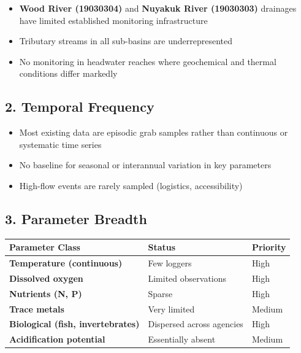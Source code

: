 \documentclass[
  letterpaper,
]{scrbook}
\providecommand{\tightlist}{%
  \setlength{\itemsep}{0pt}\setlength{\parskip}{0pt}}\usepackage{longtable,booktabs,array}
\begin{document}
\begin{itemize}
\tightlist
\item
  \textbf{Wood River (19030304)} and \textbf{Nuyakuk River (19030303)}
  drainages have limited established monitoring infrastructure
\item
  Tributary streams in all sub-basins are underrepresented
\item
  No monitoring in headwater reaches where geochemical and thermal
  conditions differ markedly
\end{itemize}

\subsection{2. Temporal Frequency}\label{temporal-frequency}

\begin{itemize}
\tightlist
\item
  Most existing data are episodic grab samples rather than continuous or
  systematic time series
\item
  No baseline for seasonal or interannual variation in key parameters
\item
  High-flow events are rarely sampled (logistics, accessibility)
\end{itemize}

\subsection{3. Parameter Breadth}\label{parameter-breadth}

\begin{longtable}[]{@{}
  >{\raggedright\arraybackslash}p{}
  >{\raggedright\arraybackslash}p{}
  >{\raggedright\arraybackslash}p{}@{}}
\toprule\noalign{}
\begin{minipage}[b]{\linewidth}\raggedright
Parameter Class
\end{minipage} & \begin{minipage}[b]{\linewidth}\raggedright
Status
\end{minipage} & \begin{minipage}[b]{\linewidth}\raggedright
Priority
\end{minipage} \\
\midrule\noalign{}
\endhead
\bottomrule\noalign{}
\endlastfoot
\textbf{Temperature (continuous)} & Few loggers & High \\
\textbf{Dissolved oxygen} & Limited observations & High \\
\textbf{Nutrients (N, P)} & Sparse & High \\
\textbf{Trace metals} & Very limited & Medium \\
\textbf{Biological (fish, invertebrates)} & Dispersed across agencies &
High \\
\textbf{Acidification potential} & Essentially absent & Medium \\
\end{longtable}
\end{document}
